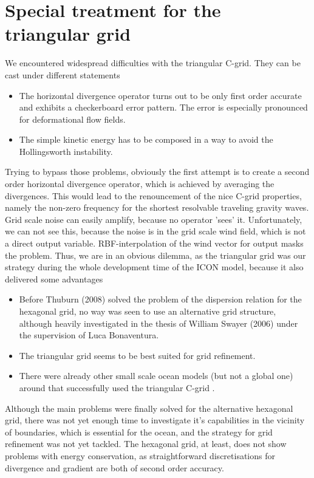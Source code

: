 %

\chapter{Special treatment for the triangular grid}

We encountered widespread difficulties with the triangular C-grid. They can be cast under
different statements
\begin{itemize}
 \item The horizontal divergence operator turns out to be only first order accurate and exhibits a
checkerboard error pattern. The error is especially pronounced for deformational flow fields.
 \item The simple kinetic energy has to be composed in a way to avoid the Hollingsworth instability.
\end{itemize}
Trying to bypass those problems, obviously the first attempt is to create a second order horizontal
divergence operator, which is achieved by averaging the divergences. This would lead to
the renouncement of the nice C-grid properties, namely the non-zero frequency for the
shortest resolvable traveling gravity waves. Grid scale noise can easily amplify, because
no operator 'sees' it. Unfortunately, we can not see this, because the noise is in the grid scale 
wind field, which is not a direct output variable. RBF-interpolation of the wind vector for output 
masks the problem. Thus, we are in an obvious dilemma, as the triangular grid was our strategy during 
the whole development time of the ICON model, because it also delivered some advantages
\begin{itemize}
 \item Before Thuburn (2008) solved the problem of the dispersion relation for the hexagonal grid, 
no way was seen to use an alternative grid structure, although heavily investigated in the thesis of
William Swayer (2006) under the supervision of Luca Bonaventura.
 \item The triangular grid seems to be best suited for grid refinement.
 \item There were already other small scale ocean models (but not a global one) around that 
successfully used the triangular C-grid .
\end{itemize}
Although the main problems were finally solved for the alternative hexagonal grid, there was not yet
enough time to investigate it's capabilities in the vicinity of boundaries, which is
essential for the ocean, and the strategy for grid refinement was not yet tackled.
The hexagonal grid, at least, does not show problems with energy conservation, as
straightforward discretisations for divergence and gradient are both of second order
accuracy.

